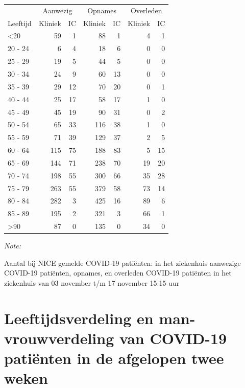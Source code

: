 \documentclass[
  english,
  man,floatsintext]{apa6}
\begin{document}
\begin{table}
\centering\begingroup\fontsize{10}{12}\selectfont

\begin{threeparttable}
\begin{tabular}{lrrrrrr}
\toprule
\multicolumn{1}{c}{ } & \multicolumn{2}{c}{Aanwezig} & \multicolumn{2}{c}{Opnames} & \multicolumn{2}{c}{Overleden} \\
\cmidrule(l{3pt}r{3pt}){2-3} \cmidrule(l{3pt}r{3pt}){4-5} \cmidrule(l{3pt}r{3pt}){6-7}
Leeftijd & Kliniek & IC & Kliniek & IC & Kliniek & IC\\
\midrule
<20 & 59 & 1 & 88 & 1 & 4 & 1\\
20 - 24 & 6 & 4 & 18 & 6 & 0 & 0\\
25 - 29 & 19 & 5 & 44 & 5 & 0 & 0\\
30 - 34 & 24 & 9 & 60 & 13 & 0 & 0\\
35 - 39 & 29 & 12 & 70 & 20 & 0 & 1\\
40 - 44 & 25 & 17 & 58 & 17 & 1 & 0\\
45 - 49 & 45 & 19 & 90 & 31 & 0 & 2\\
50 - 54 & 65 & 33 & 116 & 38 & 1 & 0\\
55 - 59 & 71 & 39 & 129 & 37 & 2 & 5\\
60 - 64 & 115 & 75 & 188 & 83 & 5 & 15\\
65 - 69 & 144 & 71 & 238 & 70 & 19 & 20\\
70 - 74 & 198 & 55 & 300 & 66 & 35 & 28\\
75 - 79 & 263 & 55 & 379 & 58 & 73 & 14\\
80 - 84 & 282 & 3 & 425 & 16 & 89 & 6\\
85 - 89 & 195 & 2 & 321 & 3 & 66 & 1\\
>90 & 87 & 0 & 135 & 0 & 34 & 0\\
\bottomrule
\end{tabular}
\begin{tablenotes}
\item \textit{Note: } 
\item Aantal bij NICE gemelde COVID-19 patiënten: in het ziekenhuis aanwezige COVID-19 patiënten, opnames, en overleden COVID-19 patiënten in het ziekenhuis van 03 november t/m 17 november 15:15 uur
\end{tablenotes}
\end{threeparttable}
\endgroup{}
\end{table}

\newpage

\hypertarget{leeftijdsverdeling-en-man-vrouwverdeling-van-covid-19-patiuxebnten-in-de-afgelopen-twee-weken}{%
\section{Leeftijdsverdeling en man-vrouwverdeling van COVID-19 patiënten in de afgelopen twee weken}\label{leeftijdsverdeling-en-man-vrouwverdeling-van-covid-19-patiuxebnten-in-de-afgelopen-twee-weken}}
\end{document}
